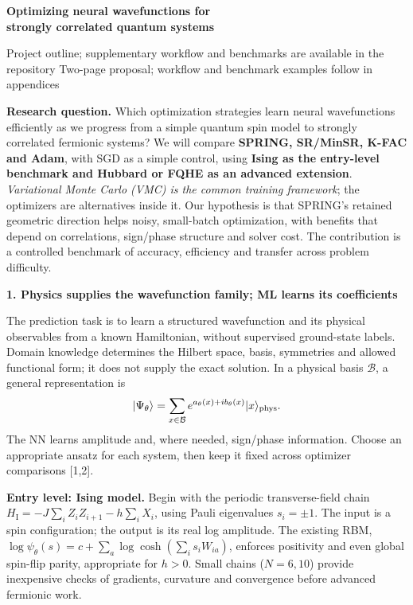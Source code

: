 \documentclass[10pt,letterpaper]{article}
\newcommand{\topic}[1]{\vspace{4pt}\textbf{\color{ink}#1}\par}
\begin{document}
\begin{center}
{\Large\bfseries Optimizing neural wavefunctions for\\strongly correlated quantum systems}\par
\vspace{3pt}
\ifdefined\OutlineOnly
{\small Project outline; supplementary workflow and benchmarks are available in the repository}
\else
{\small Two-page proposal; workflow and benchmark examples follow in appendices}
\fi
\end{center}

\textbf{Research question.} Which optimization strategies learn neural wavefunctions efficiently as we progress from a simple quantum spin model to strongly correlated fermionic systems? We will compare \textbf{SPRING, SR/MinSR, K-FAC and Adam}, with SGD as a simple control, using \textbf{Ising as the entry-level benchmark and Hubbard or FQHE as an advanced extension}. \emph{Variational Monte Carlo (VMC) is the common training framework}; the optimizers are alternatives inside it. Our hypothesis is that SPRING's retained geometric direction helps noisy, small-batch optimization, with benefits that depend on correlations, sign/phase structure and solver cost. The contribution is a controlled benchmark of accuracy, efficiency and transfer across problem difficulty.

\topic{1. Physics supplies the wavefunction family; ML learns its coefficients}
The prediction task is to learn a structured wavefunction and its physical observables from a known Hamiltonian, without supervised ground-state labels. Domain knowledge determines the Hilbert space, basis, symmetries and allowed functional form; it does not supply the exact solution. In a physical basis $\mathcal B$, a general representation is
\begin{equation}
 |\Psi_\theta\rangle=\sum_{x\in\mathcal B}e^{a_\theta(x)+ib_\theta(x)}|x\rangle_{\rm phys}.
\end{equation}
The NN learns amplitude and, where needed, sign/phase information. Choose an appropriate ansatz for each system, then keep it fixed across optimizer comparisons [1,2].

\textbf{Entry level: Ising model.} Begin with the periodic transverse-field chain
$H_{\mathrm I}=-J\sum_i Z_iZ_{i+1}-h\sum_iX_i$, using Pauli eigenvalues $s_i=\pm1$.
The input is a spin configuration; the output is its real log amplitude. The existing RBM,
$\log\psi_\theta(s)=c+\sum_a\log\cosh(\sum_i s_iW_{ia})$, enforces positivity and even global spin-flip parity, appropriate for $h>0$. Small chains ($N=6,10$) provide inexpensive checks of gradients, curvature and convergence before advanced fermionic work.
\end{document}

